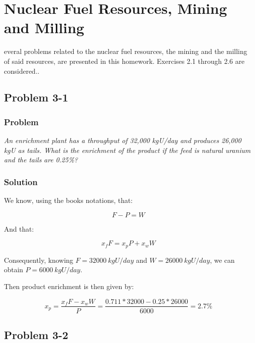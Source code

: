 %
%
\let\textcircled=\pgftextcircled
\chapter{Nuclear Fuel Resources, Mining and Milling}
\label{chap:intro}

everal problems related to the nuclear fuel resources, the mining and the milling of said resources, are presented in this homework. Exercises 2.1 through 2.6 are considered..

\section{Problem 3-1}
\label{prob31}


\subsection{Problem}
\textit{An enrichment plant has a throughput of 32,000 kgU/day and produces 26,000 kgU as tails. What is the enrichment of the product if the feed is natural uranium and the tails are 0.25\%?}

\subsection{Solution}

We know, using the books notations, that:

\begin{equation}
F - P = W
\end{equation}

And that:

\begin{equation}
x_fF = x_pP + x_wW
\end{equation}

Consequently, knowing $F=32000\ kgU/day$ and $W=26000\ kgU/day$, we can obtain $P=6000\ kgU/day$.

Then product enrichment is then given by:

\begin{equation}
x_p = \frac{x_fF - x_wW}{P} = \frac{0.711*32000-0.25*26000}{6000} = 2.7\%
\end{equation}



\section{Problem 3-2}
\label{prob32}

